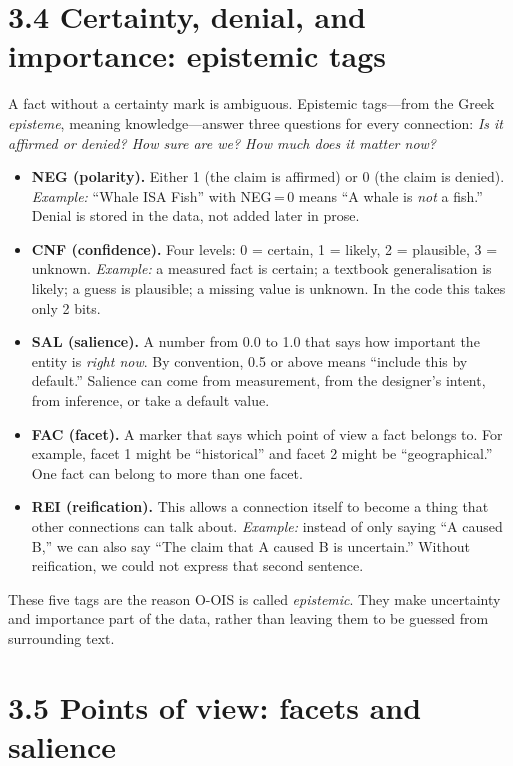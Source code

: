 \section*{3.4 Certainty, denial, and importance: epistemic tags}
\label{sec:epistemic}

A fact without a certainty mark is ambiguous. Epistemic tags---from the Greek \textit{episteme}, meaning knowledge---answer three questions for every connection: \textit{Is it affirmed or denied? How sure are we? How much does it matter now?}

\begin{itemize}
\item \textbf{NEG (polarity).} Either 1 (the claim is affirmed) or 0 (the claim is denied). \textit{Example:} ``Whale ISA Fish'' with NEG\,=\,0 means ``A whale is \textit{not} a fish.'' Denial is stored in the data, not added later in prose.
\item \textbf{CNF (confidence).} Four levels: 0 = certain, 1 = likely, 2 = plausible, 3 = unknown. \textit{Example:} a measured fact is certain; a textbook generalisation is likely; a guess is plausible; a missing value is unknown. In the code this takes only 2 bits.
\item \textbf{SAL (salience).} A number from 0.0 to 1.0 that says how important the entity is \textit{right now}. By convention, 0.5 or above means ``include this by default.'' Salience can come from measurement, from the designer's intent, from inference, or take a default value.
\item \textbf{FAC (facet).} A marker that says which point of view a fact belongs to. For example, facet 1 might be ``historical'' and facet 2 might be ``geographical.'' One fact can belong to more than one facet.
\item \textbf{REI (reification).} This allows a connection itself to become a thing that other connections can talk about. \textit{Example:} instead of only saying ``A caused B,'' we can also say ``The claim that A caused B is uncertain.'' Without reification, we could not express that second sentence.
\end{itemize}

These five tags are the reason O-OIS is called \textit{epistemic}. They make uncertainty and importance part of the data, rather than leaving them to be guessed from surrounding text.

\section*{3.5 Points of view: facets and salience}


